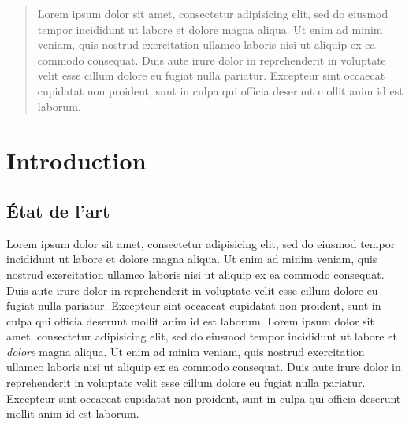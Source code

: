 



\maketitle
{}

\begin{abstract}
  Lorem ipsum dolor sit amet, consectetur adipisicing elit, sed do
  eiusmod tempor incididunt ut labore et dolore magna aliqua. Ut enim ad
  minim veniam, quis nostrud exercitation ullamco laboris nisi ut
  aliquip ex ea commodo consequat. Duis aute irure dolor in
  reprehenderit in voluptate velit esse cillum dolore eu fugiat nulla
  pariatur. Excepteur sint occaecat cupidatat non proident, sunt in
  culpa qui officia deserunt mollit anim id est laborum.
\end{abstract}


\section{Introduction}

\subsection{État de l'art}

Lorem ipsum dolor sit amet, consectetur adipisicing elit, sed do
eiusmod tempor incididunt ut labore et dolore magna aliqua. Ut enim ad
minim veniam, quis nostrud exercitation ullamco laboris nisi ut
aliquip ex ea commodo consequat. Duis aute irure dolor in
reprehenderit in voluptate velit esse cillum dolore eu fugiat nulla
pariatur. Excepteur sint occaecat cupidatat non proident, sunt in
culpa qui officia deserunt mollit anim id est laborum. Lorem ipsum
dolor sit amet, consectetur adipisicing elit, sed do eiusmod tempor
incididunt ut labore et \emph{dolore} magna aliqua. Ut enim ad minim
veniam, quis nostrud exercitation ullamco laboris nisi ut aliquip ex
ea commodo consequat. Duis aute irure dolor in reprehenderit in
voluptate velit esse cillum dolore eu fugiat nulla pariatur. Excepteur
sint occaecat cupidatat non proident, sunt in culpa qui officia
deserunt mollit anim id est laborum.

